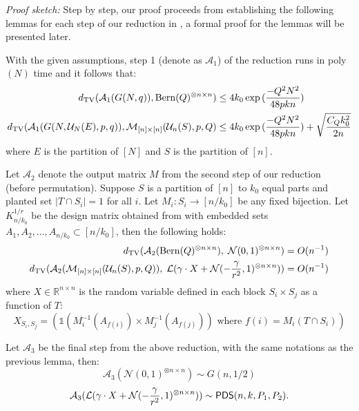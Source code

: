 \documentclass[final,12pt]{colt2023} %
\newcommand\1[1]{\mathbb{I}_{\left\{#1\right\}}}
\begin{document}
\textit{Proof sketch:} Step by step, our proof proceeds from establishing the following lemmas for each step of our reduction in , {a formal proof for the lemmas will be presented later}.
\begin{lemma} \label{TOBIPARTITE}
With the given assumptions, step 1 (denote as $\mathcal{A}_1$) of the reduction runs in poly$(N)$ time and it follows that:
\begin{align*}
    d_{\rm TV}(\mathcal{A}_1(G(N, q)), {\rm Bern}(Q)^{\otimes n\times n})&\leq 4k_0\exp{(\frac{-Q^2N^2}{48pkn})}\\
    d_{\rm TV}(\mathcal{A}_1(G(N, \mathcal{U}_N(E),p, q)), \mathcal{M}_{[n]\times [n]}(\mathcal{U}_n(S), p, Q)&\leq 4k_0\exp{(\frac{-Q^2N^2}{48pkn})}+\sqrt{\frac{C_Q k_0^2}{2n}}
\end{align*}
where $E$ is the partition of $[N]$ and $S$ is the partition of $[n].$
\end{lemma}
\begin{lemma} \label{BernRotation} Let $\mathcal{A}_2$ denote the output matrix $M$ from the second step of our reduction (before permutation). Suppose $S$ is a partition of $[n]$ to $k_0$ equal parts and planted set $|T\cap S_i|=1$ for all $i$. Let $M_i: S_i\to [n/k_0]$ be any fixed bijection. Let $K_{n/k_0}^{1/r}$ be the design matrix obtained from  with embedded sets $A_1, A_2,\dots, A_{n/k_0}\subset [n/k_0]$, then the following holds:
\begin{align*}d_{\rm TV}(\mathcal{A}_2({\rm Bern}(Q)^{\otimes n\times n}), \;\mathcal{N}(0, 1)^{\otimes n\times n} )&=O(n^{-1})\\
d_{\rm TV}(\mathcal{A}_2(\mathcal{M}_{[n]\times [n]}(\mathcal{U}_n(S), p, Q)),\; \mathcal{L}( \gamma\cdot X+\mathcal{N}(-\frac{\gamma}{r^2}, 1)^{\otimes n\times n}))&=O(n^{-1})
\end{align*}
where $X\in \mathbb{R}^{n\times n}$ is the random variable defined in each block $S_i\times S_j$ as a function of $T$:$$X_{S_i, S_j}=\left(
\text{$\mathds{1}(M_i^{-1}(A_{f(i)})\times M_j^{-1}(A_{f(j)}))$ where $f(i)=M_i(T\cap S_i)$}\right)$$
\end{lemma}
\begin{lemma} \label{Gaussianization}
Let $\mathcal{A}_3$ be the final step from the above reduction, with the same notations as the previous lemma, then:
$$\mathcal{A}_3(\mathcal{N}(0, 1)^{\otimes n\times n})\sim G(n, 1/2)$$
$$\mathcal{A}_3(\mathcal{L}( \gamma\cdot X+\mathcal{N}(-\frac{\gamma}{r^2}, 1)^{\otimes n\times n}))\sim \mathsf{PDS}(n, k, P_1, P_2).$$
\end{lemma}
\end{document}
